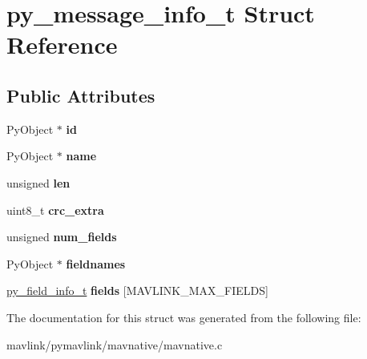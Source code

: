 \hypertarget{structpy__message__info__t}{}\section{py\+\_\+message\+\_\+info\+\_\+t Struct Reference}
\label{structpy__message__info__t}
\subsection*{Public Attributes}
\begin{DoxyCompactItemize}
\item 
\mbox{\label{structpy__message__info__t_abd5a280b35c6534c5089c17f98712515}} 
Py\+Object $\ast$ {\bfseries id}
\item 
\mbox{\label{structpy__message__info__t_a87ac2fb875bbd6ec271f45acf67406cc}} 
Py\+Object $\ast$ {\bfseries name}
\item 
\mbox{\label{structpy__message__info__t_a646d85370d95c920c9191a26bfffec98}} 
unsigned {\bfseries len}
\item 
\mbox{\label{structpy__message__info__t_a8cbb192018d74ba6d9ab31e2fd605cb9}} 
uint8\+\_\+t {\bfseries crc\+\_\+extra}
\item 
\mbox{\label{structpy__message__info__t_a65574d6cccbb71271cfb45f491bd678d}} 
unsigned {\bfseries num\+\_\+fields}
\item 
\mbox{\label{structpy__message__info__t_af1984cbd790c723d78663f15cf560542}} 
Py\+Object $\ast$ {\bfseries fieldnames}
\item 
\mbox{\label{structpy__message__info__t_a6c8f190efd318675b963df07e77d5586}} 
\hyperlink{structpy__field__info__t}{py\+\_\+field\+\_\+info\+\_\+t} {\bfseries fields} \mbox{[}M\+A\+V\+L\+I\+N\+K\+\_\+\+M\+A\+X\+\_\+\+F\+I\+E\+L\+DS\mbox{]}
\end{DoxyCompactItemize}


The documentation for this struct was generated from the following file\+:\begin{DoxyCompactItemize}
\item 
mavlink/pymavlink/mavnative/mavnative.\+c\end{DoxyCompactItemize}
